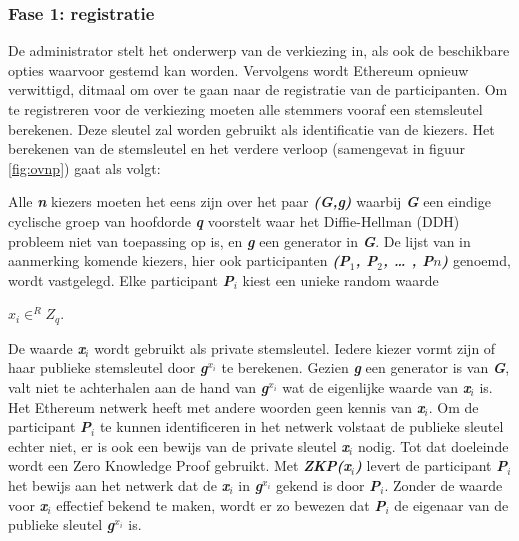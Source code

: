 		\subsubsection*{Fase 1: registratie }
			De administrator stelt het onderwerp van de verkiezing in, als ook de beschikbare opties waarvoor gestemd kan worden. Vervolgens wordt Ethereum opnieuw verwittigd, ditmaal om over te gaan naar de registratie van de participanten. Om te registreren voor de verkiezing moeten alle stemmers vooraf een stemsleutel berekenen. Deze sleutel zal worden gebruikt als identificatie van de kiezers. Het berekenen  van de stemsleutel en het verdere verloop (samengevat in figuur \ref{fig:ovnp}) gaat als volgt: 
			
			Alle \textbf{\textit{n}} kiezers moeten het eens zijn over het paar \textbf{\textit{(G,g)}} waarbij \textbf{\textit{G}} een eindige cyclische groep van hoofdorde \textbf{\textit{q}} voorstelt waar het Diffie-Hellman (DDH) probleem niet van toepassing op is, en \textbf{\textit{g}} een generator in \textbf{\textit{G}}. De lijst van in aanmerking komende kiezers, hier ook participanten \textbf{\textit{(P$_{1}$, P$_{2}$, … , P${n}$)}} genoemd, wordt vastgelegd. Elke participant \textbf{\textit{P$_{i}$}} kiest een unieke random waarde  
			
			\textbf{\textit{$x_{i} \in^{R} Z_{q}$}}.
			
			 De waarde \textbf{\textit{x$_{i}$}} wordt gebruikt als private stemsleutel. Iedere kiezer vormt zijn of haar publieke stemsleutel door \textbf{\textit{g$^{x_{i}}$}} te berekenen. Gezien \textbf{\textit{g}} een generator is van \textbf{\textit{G}}, valt niet te achterhalen aan de hand van \textbf{\textit{g$^{x_{i}}$}} wat de eigenlijke waarde van \textbf{\textit{x$_{i}$}} is. Het Ethereum netwerk heeft met andere woorden geen kennis van \textbf{\textit{x$_{i}$}}. Om de participant \textbf{\textit{P$_{i}$}} te kunnen identificeren in het netwerk volstaat de publieke sleutel echter niet, er is ook een bewijs van de private sleutel \textbf{\textit{x$_{i}$}} nodig. Tot dat doeleinde wordt een Zero Knowledge Proof gebruikt. Met \textbf{\textit{ZKP(x$_{i}$)}} levert de participant \textbf{\textit{P$_{i}$}}  het bewijs aan het netwerk dat de \textbf{\textit{x$_{i}$}}  in \textbf{\textit{g$^{x_{i}}$}} gekend is door \textbf{\textit{P$_{i}$}}. Zonder de waarde voor \textbf{\textit{x$_{i}$}}  effectief bekend te maken, wordt er zo bewezen dat \textbf{\textit{P$_{i}$}} de eigenaar van de publieke sleutel \textbf{\textit{g$^{x_{i}}$}} is.
			
